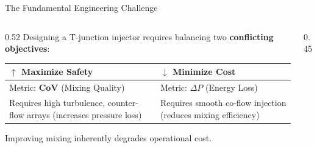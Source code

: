 \documentclass[10pt, aspectratio=169]{beamer}
\begin{document}
\begin{frame}{The Fundamental Engineering Challenge}
    \begin{columns}[T]
        \begin{column}{0.52\textwidth}
            Designing a T-junction injector requires balancing two \textbf{conflicting objectives}:
            
            \vspace{0.4em}
            \begin{table}
                \centering
                \scriptsize
                \begin{tabular}{@{}p{}p{}@{}}
                    \toprule
                    \cellcolor{green!15}\textbf{$\uparrow$ Maximize Safety} &
                    \cellcolor{red!15}\textbf{$\downarrow$ Minimize Cost} \\
                    \midrule
                    Metric: \textbf{CoV} (Mixing Quality) & Metric: \textbf{$\Delta P$} (Energy Loss) \\[4pt]
                    Requires high turbulence, counter-flow arrays (\alert{increases pressure loss}) & Requires smooth co-flow injection (\alert{reduces mixing efficiency}) \\
                    \bottomrule
                \end{tabular}
            \end{table}

            \vspace{0.2em}
            \begin{block}{}
                \centering
                \small
                \alert{Improving mixing inherently degrades operational cost.}
            \end{block}
        \end{column}
        \begin{column}{0.45\textwidth}
            \vspace{1.5em}
            \begin{center}
\end{center}
\end{column}
\end{columns}
\end{frame}
\end{document}
